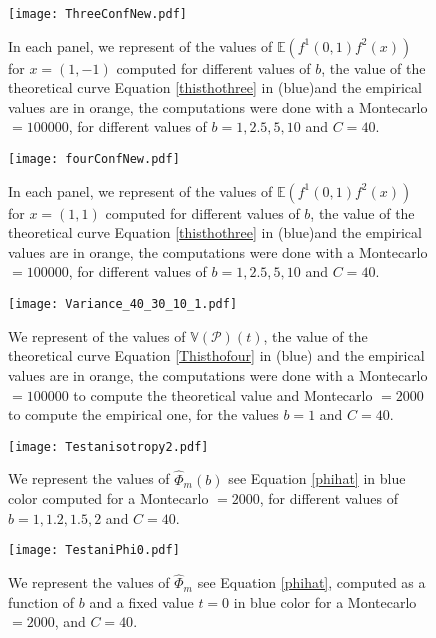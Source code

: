 \documentclass[12pt]{article}
\renewcommand{\hat}{\widehat}
\theoremstyle{Theorem}
\begin{document}
{\begin{figure}[H]
  \centering
    {\texttt{[image: ThreeConfNew.pdf]}}
    \hspace{0.2cm}
 \caption{In each panel, we represent of the values of $\mathbb{E}\left(f^{1}(0,1)f^{2}(x)\right)$ for $x = (1,-1)$ computed for different values of $b$, the value of the theoretical curve Equation \eqref{thisthothree} in (blue)and the empirical values are in orange, the computations were done with a Montecarlo $= 100000$, for different values of $b = 1, 2.5, 5, 10$ and $C = 40$. }
\label{fig2}
\end{figure}

\begin{figure}[H]
  \centering
    {\texttt{[image: fourConfNew.pdf]}}
    \hspace{0.2cm}
 \caption{In each panel, we represent of the values of $\mathbb{E}\left(f^{1}(0,1)f^{2}(x)\right)$ for $x = (1, 1)$ computed for different values of $b$, the value of the theoretical curve Equation \eqref{thisthothree} in (blue)and the empirical values are in orange, the computations were done with a Montecarlo $= 100000$, for different values of $b = 1, 2.5, 5, 10$ and $C = 40$. }
\label{fig2}
\end{figure}

\begin{figure}[H]
  \centering
    {\texttt{[image: Variance\_40\_30\_10\_1.pdf]}}
    \hspace{0.2cm}
 \caption{We represent of the values of $\mathbb{V}\left(\mathcal{P}\right)(t)$, the value of the theoretical curve Equation \eqref{Thisthofour} in (blue) and the empirical values are in orange, the computations were done with a Montecarlo $= 100000$ to compute the theoretical value and Montecarlo $= 2000$ to compute the empirical one, for the values $b = 1$ and $C = 40$. }
\label{fig2}
\end{figure}

\begin{figure}[H]
  \centering
    {\texttt{[image: Testanisotropy2.pdf]}}
    \hspace{0.2cm} 
 \caption{We represent the values of $\hat{\Phi}_{m}(b)$ see Equation \eqref{phihat} in blue color computed for a Montecarlo $= 2000$, for different values of $b = 1, 1.2, 1.5, 2$ and $C = 40$.}
\label{fig2}
\end{figure}

\begin{figure}[H]
  \centering
    {\texttt{[image: TestaniPhi0.pdf]}}
    \hspace{0.2cm} 
 \caption{We represent the values of $\hat{\Phi}_{m}$ see Equation \eqref{phihat}, computed as a function of $b$ and a fixed value $t=0$ in blue color for a Montecarlo $= 2000$, and $C = 40$.}
\label{fig2}
\end{figure}

}
\end{document}
